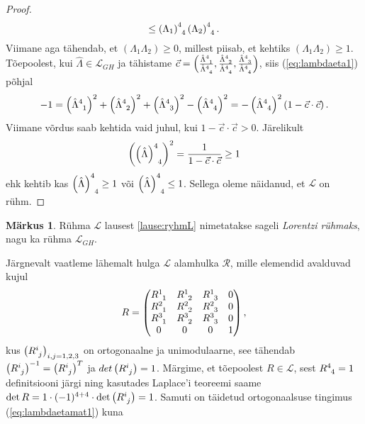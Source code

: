\documentclass[12pt,a4paper,oneside]{article}
\theoremstyle{plain}
\theoremstyle{definition}
\newtheorem{markus}{Märkus}[section]
\numberwithin{equation}{section}
\def\L{{\mathcal L}}
\begin{document}
\begin{proof}
\[\leq \left(\Lambda_1\right)\indices{^4_4} 
\left(\Lambda_2\right)\indices{^4_4}.\] 
Viimane aga tähendab, et $\left(\Lambda_1 \Lambda_2\right) \geq 0$, 
millest piisab, et kehtiks 
$\left(\Lambda_1 \Lambda_2\right) \geq 1$. Tõepoolest, 
kui $\hat{\Lambda} \in \L_{GH}$ ja tähistame 
$\vec{c} = \left(\frac{\hat{\Lambda}\indices{^4_1}}
{\hat{\Lambda}\indices{^4_4}}, 
\frac{\hat{\Lambda}\indices{^4_2}}{\hat{\Lambda}\indices{^4_4}}, 
\frac{\hat{\Lambda}\indices{^4_3}}{\hat{\Lambda}\indices{^4_4}}\right)$, 
siis (\ref{eq:lambdaeta1}) põhjal
\[ -1 = \left(\hat{\Lambda}\indices{^4_1}\right)^2 + 
\left(\hat{\Lambda}\indices{^4_2}\right)^2 + 
\left(\hat{\Lambda}\indices{^4_3}\right)^2 - 
\left(\hat{\Lambda}\indices{^4_4}\right)^2 = 
- \left(\hat{\Lambda}\indices{^4_4}\right)^2 
\left(1 - \vec{c} \cdot \vec{c}\right). \]
Viimane võrdus saab kehtida vaid juhul, kui 
$1 - \vec{c} \cdot \vec{c} > 0$. Järelikult
\[\left(\left(\hat{\Lambda}\right)\indices{^4_4}\right)^2 = 
\frac{1}{1 - \vec{c}\cdot\vec{c}} \geq 1\]
ehk kehtib kas $\left(\hat{\Lambda}\right)\indices{^4_4} \geq 1$ 
või $\left(\hat{\Lambda}\right)\indices{^4_4} \leq 1$. 
Sellega oleme näidanud, et $\L$ on rühm.
\end{proof}
\begin{markus}
Rühma $\L$ lausest \ref{lause:ryhmL} nimetatakse sageli 
\emph{Lorentzi rühmaks}, nagu ka rühma $\L_{GH}$.
\end{markus}
Järgnevalt vaatleme lähemalt hulga $\L$ alamhulka $\mathcal{R}$, 
mille elemendid avalduvad kujul
\[R = \begin{pmatrix}
R\indices{^1_1} & R\indices{^1_2} & R\indices{^1_3} & 0 \\ 
R\indices{^2_1} & R\indices{^2_2} & R\indices{^2_3} & 0 \\  
R\indices{^3_1} & R\indices{^3_2} & R\indices{^3_3} & 0 \\ 
0 & 0 & 0 & 1 \\ 
\end{pmatrix},\]
kus $\left(R\indices{^i_j}\right)_{i,j = 1,2,3}$ on ortogonaalne 
ja unimodulaarne, see tähendab $\left(R\indices{^i_j}\right)^{-1} = 
\left(R\indices{^i_j}\right)^T$ ja $det \left(R\indices{^i_j}\right) 
= 1$. Märgime, et tõepoolest $R \in \L$, sest $R\indices{^4_4} = 1$ 
definitsiooni järgi ning kasutades Laplace'i teoreemi saame 
$\det R = 1 \cdot (-1)^{4+4} \cdot \det \left(R\indices{^i_j}\right) 
= 1$. Samuti on täidetud ortogonaalsuse tingimus 
(\ref{eq:lambdaetamat1}) kuna
\end{document}
